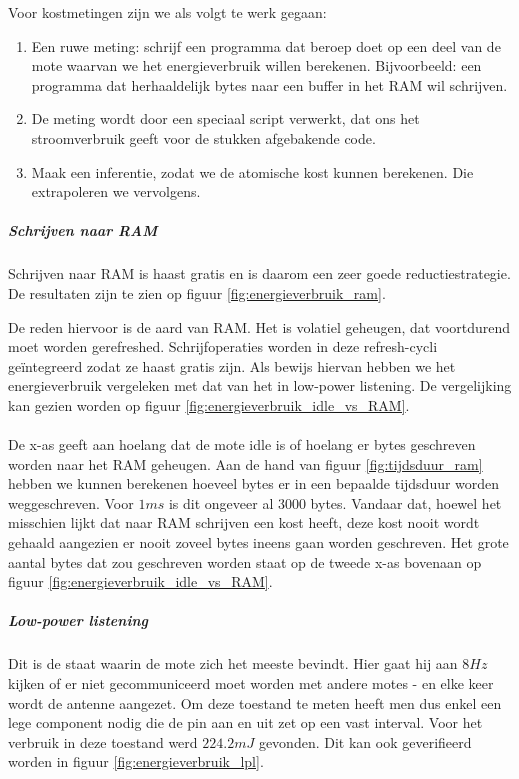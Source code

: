 \documentclass[11pt]{article}
\begin{document}
Voor kostmetingen zijn we als volgt te werk gegaan:

\begin{enumerate}
\item Een ruwe meting: schrijf een programma dat beroep doet op een deel
van de mote waarvan we het energieverbruik willen berekenen. Bijvoorbeeld: een
programma dat herhaaldelijk bytes naar een buffer in het RAM wil schrijven. 
\item De meting wordt door een speciaal script verwerkt, dat ons het stroomverbruik geeft voor de stukken afgebakende code.
\item Maak een inferentie, zodat we de atomische kost kunnen berekenen. Die extrapoleren we vervolgens.
\end{enumerate}

\subparagraph{Schrijven naar RAM}

Schrijven naar RAM is haast gratis en is daarom een zeer goede
reductiestrategie. De resultaten zijn te zien op figuur \ref{fig:energieverbruik_ram}.

De reden hiervoor is de aard van RAM. Het is volatiel geheugen, dat voortdurend
moet worden gerefreshed. Schrijfoperaties worden in deze refresh-cycli
ge\"integreerd zodat ze haast gratis zijn. Als bewijs hiervan hebben we het energieverbruik vergeleken met dat van het in low-power listening. 
De vergelijking kan gezien worden op figuur \ref{fig:energieverbruik_idle_vs_RAM}.\\
\\
De x-as geeft aan hoelang dat de mote idle is of hoelang er bytes geschreven worden naar het RAM geheugen. Aan de hand van figuur \ref{fig:tijdsduur_ram} hebben we kunnen berekenen hoeveel bytes er in een bepaalde tijdsduur worden weggeschreven. Voor $1ms$ is dit ongeveer al 3000 bytes. Vandaar dat, hoewel het misschien lijkt dat naar RAM schrijven een kost heeft, deze kost nooit wordt gehaald aangezien er nooit zoveel bytes ineens gaan worden geschreven. Het grote aantal bytes dat zou geschreven worden staat op de tweede x-as bovenaan op figuur \ref{fig:energieverbruik_idle_vs_RAM}. 
\subparagraph{Low-power listening}
Dit is de staat waarin de mote zich het meeste bevindt. Hier gaat hij aan $8Hz$
kijken of er niet gecommuniceerd moet worden met andere motes - en elke keer
wordt de antenne aangezet. Om deze toestand te meten heeft men dus enkel een
lege component nodig die de pin aan en uit zet op een vast interval. Voor het
verbruik in deze toestand werd $224.2mJ$ gevonden. Dit kan ook geverifieerd worden
in figuur \ref{fig:energieverbruik_lpl}.
\end{document}
